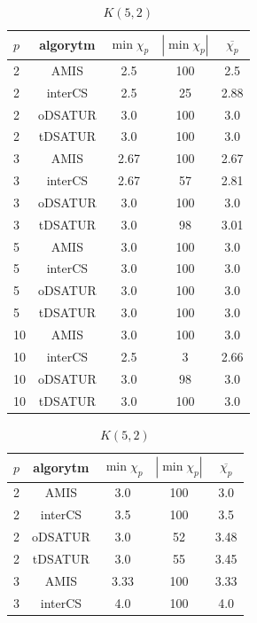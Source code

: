 \documentclass[10pt,a4paper]{article}
\begin{document}
	\begin{table}[H]
		\begin{minipage}{.5\linewidth}
			\centering
			\begin{tabular}{|l|c|c|c|c|}
				\hline
				\textbf{$p$} & \textbf{algorytm} & \textbf{$\min \chi_{p}$} & \textbf{$|\min \chi_{p}|$} & \textbf{$\overline{\chi_{p}}$} \\
				\hline
				2 & AMIS & 2.5 & 100 & 2.5 \\
				2 & interCS & 2.5 & 25 & 2.88 \\
				2 & oDSATUR & 3.0 & 100 & 3.0 \\
				2 & tDSATUR & 3.0 & 100 & 3.0 \\
				\hline
				3 & AMIS & 2.67 & 100 & 2.67 \\
				3 & interCS & 2.67 & 57 & 2.81 \\
				3 & oDSATUR & 3.0 & 100 & 3.0 \\
				3 & tDSATUR & 3.0 & 98 & 3.01 \\
				\hline
				5 & AMIS & 3.0 & 100 & 3.0 \\
				5 & interCS & 3.0 & 100 & 3.0 \\
				5 & oDSATUR & 3.0 & 100 & 3.0 \\
				5 & tDSATUR & 3.0 & 100 & 3.0 \\
				\hline
				10 & AMIS & 3.0 & 100 & 3.0 \\
				10 & interCS & 2.5 & 3 & 2.66 \\
				10 & oDSATUR & 3.0 & 98 & 3.0 \\
				10 & tDSATUR & 3.0 & 100 & 3.0 \\
				\hline
			\end{tabular}
			\caption{$K(5,2)$}
		\end{minipage}%
		\begin{minipage}{.5\linewidth}
			\centering
			\begin{tabular}{|l|c|c|c|c|}
				\hline
				\textbf{$p$} & \textbf{algorytm} & \textbf{$\min \chi_{p}$} & \textbf{$|\min \chi_{p}|$} & \textbf{$\overline{\chi_{p}}$} \\
				\hline
				2 & AMIS & 3.0 & 100 & 3.0 \\
				2 & interCS & 3.5 & 100 & 3.5 \\
				2 & oDSATUR & 3.0 & 52 & 3.48 \\
				2 & tDSATUR & 3.0 & 55 & 3.45 \\
				\hline
				3 & AMIS & 3.33 & 100 & 3.33 \\
				3 & interCS & 4.0 & 100 & 4.0 \\

\end{tabular}
\end{minipage}
\end{table}
\end{document}
